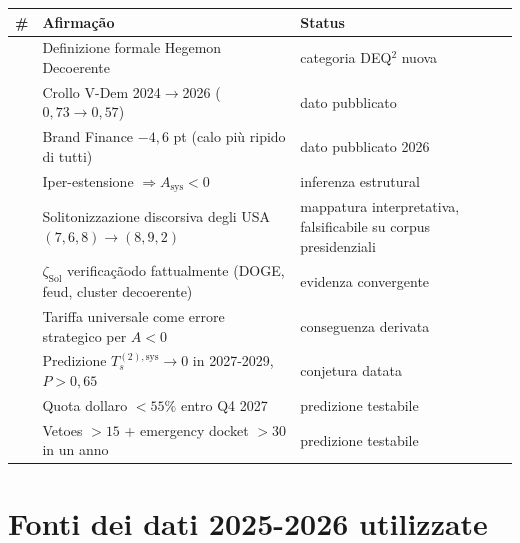 {\def\LTcaptype{none} %
{\small\begin{longtable}[]{@{}
  >{\raggedright\arraybackslash}p{}
  >{\raggedright\arraybackslash}p{}
  >{\raggedright\arraybackslash}p{}@{}}
\toprule\noalign{}
\begin{minipage}[b]{\linewidth}\raggedright
\#
\end{minipage} & \begin{minipage}[b]{\linewidth}\raggedright
Afirmação
\end{minipage} & \begin{minipage}[b]{\linewidth}\raggedright
Status
\end{minipage} \\
\midrule\noalign{}
\endhead
\bottomrule\noalign{}
\endlastfoot
1 & Definizione formale Hegemon Decoerente & \Hypoth{} categoria DEQ$^2$
nuova \\
2 & Crollo V-Dem 2024$\to$2026 (\(0{,}73 \to 0{,}57\)) & \Proved{} dato
pubblicato \\
3 & Brand Finance \(-4{,}6\) pt (calo più ripido di tutti) & \Proved{}
dato pubblicato 2026 \\
4 & Iper-estensione \(\Rightarrow A_{\text{sys}} < 0\) & \Hypoth{}
inferenza estrutural \\
5 & Solitonizzazione discorsiva degli USA \((7,6,8) \to (8,9,2)\) &
\Conj{} mappatura interpretativa, falsificabile su corpus
presidenziali \\
6 & \(\zeta_{\text{Sol}}\) verificaçãodo fattualmente (DOGE, feud, cluster
decoerente) & \Proved{} evidenza convergente \\
7 & Tariffa universale come errore strategico per \(A < 0\) & \Hypoth{}
conseguenza derivata \\
8 & Predizione \(T_s^{(2),\text{sys}} \to 0\) in 2027-2029,
\(P > 0{,}65\) & \Conj{} conjetura datata \\
9 & Quota dollaro \(< 55\%\) entro Q4 2027 & \Conj{} predizione
testabile \\
10 & Vetoes \(> 15\) + emergency docket \(> 30\) in un anno & \Conj{}
predizione testabile \\
\end{longtable}}
}



\section{Fonti dei dati 2025-2026
utilizzate}\label{fonti-dei-dati-2025-2026-utilizzate}

